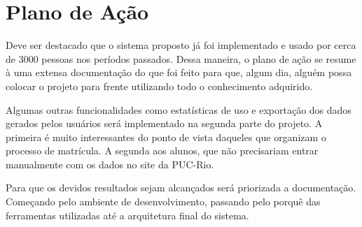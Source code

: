 
\chapter{Plano de A\c{c}\~ao}

Deve ser destacado que o sistema proposto já foi implementado e usado por cerca de 3000 pessoas nos períodos passados. Dessa maneira, o plano de ação se resume à uma extensa documentação do que foi feito para que, algum dia, alguém possa colocar o projeto para frente utilizando todo o conhecimento adquirido.

Algumas outras funcionalidades como estatísticas de uso e exportação dos dados gerados pelos usuários será implementado na segunda parte do projeto. A primeira é muito interessantes do ponto de vista daqueles que organizam o processo de matrícula. A segunda aos alunos, que não precisariam entrar manualmente com os dados no site da PUC-Rio.

Para que os devidos resultados sejam alcançados será priorizada a documentação. Começando pelo ambiente de desenvolvimento, passando pelo porquê das ferramentas utilizadas até a arquitetura final do sistema.
